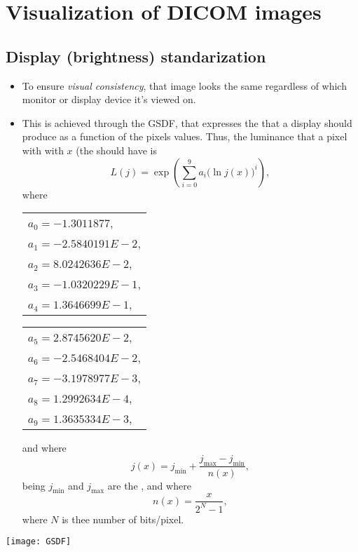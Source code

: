 \chapter{Visualization of \gls{DICOM} images}

\section{Display (brightness) standarization}
\begin{itemize}
\item To ensure \emph{visual consistency}, that image looks the same
  regardless of which monitor or display device it's viewed on.
\item This is achieved through the \gls{GSDF}, that expresses the
   that a display should produce as a function
  of the pixels values. Thus, the luminance that a pixel with with
   $x$ (the
  should have is
  \begin{equation}
    L(j) = \exp\left(\sum_{i=0}^{9}a_i\big(\ln j(x)\big)^i\right),
  \end{equation}
  where
  \begin{center}
  \begin{tabular}{l}
    $a_0 = -1.3011877$, \\
    $a_1 = -2.5840191E-2$, \\
    $a_2 = 8.0242636E-2$, \\
    $a_3 = -1.0320229E-1$, \\
    $a_4 = 1.3646699E-1$, \\
  \end{tabular}
  \begin{tabular}{l}
    $a_5 = 2.8745620E-2$, \\
    $a_6 = -2.5468404E-2$,\\
    $a_7 = -3.1978977E-3$, \\
    $a_8 = 1.2992634E-4$, \\
    $a_9 = 1.3635334E-3$,
  \end{tabular}
  \end{center}
  and where
  \begin{equation}
    j(x) = j_{\text{min}} + \frac{j_{\text{max}} - j_{\text{min}}}{n(x)},
  \end{equation}
  being $j_{\text{min}}$ and $j_{\text{max}}$ are the , and where
  \begin{equation}
    n(x) = \frac{x}{2^N-1},
  \end{equation}
  where $N$ is thee number of bits/pixel.
\end{itemize}
\begin{center}
  \texttt{[image: GSDF]}
\end{center}

